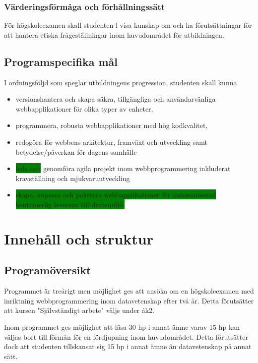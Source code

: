 \documentclass[swedish]{LnuCmThesis}
\begin{document}
\subsubsection*{Värderingsförmåga och förhållningssätt}

För högskoleexamen skall studenten
l visa kunskap om och ha förutsättningar för att hantera etiska frågeställningar
inom huvudområdet för utbildningen.

\subsection*{Programspecifika mål}

I ordningsföljd som speglar utbildningens progression, studenten skall kunna

\begin{itemize}
    \item versionshantera och skapa säkra, tillgängliga och användarvänliga webbapplikationer för olika typer av enheter,
    \item programmera, robusta webbapplikationer med hög kodkvalitet,
    \item redogöra för webbens arkitektur, framväxt och utveckling samt betydelse/påverkan för dagens samhälle
    \item \colorbox{green}{leda och} genomföra agila projekt inom webbprogrammering inkluderat kravställning och mjukvaruutveckling
    \item \colorbox{green}{skapa, anpassa och paketera webbapplikationer för automatiserad kontinuerlig leverans till driftsmiljö.}
\end{itemize}

\section*{Innehåll och struktur}

\subsection*{Programöversikt}
Programmet är treårigt men möjlighet ges att ansöka om en högskoleexamen med inriktning webbprogrammering inom datavetenskap efter två år. Detta förutsätter att kursen "Självständigt arbete" väljs under åk2.

Inom programmet ges möjlighet att läsa 30 hp i annat ämne varav 15 hp kan väljas bort till förmån för en fördjupning inom huvudområdet. Detta förutsätter dock att studenten tillskansat sig 15 hp i annat ämne än datavetenskap på annat sätt.
\end{document}
